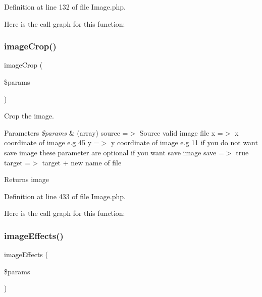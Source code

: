 Definition at line 132 of file Image.\+php.

Here is the call graph for this function\+:
\mbox{\label{class_zest_1_1_image_1_1_image_ac5079c30e25e4793c492478b097212fb}} 
\subsubsection{\texorpdfstring{image\+Crop()}{imageCrop()}}
{\footnotesize\ttfamily image\+Crop (\begin{DoxyParamCaption}\item[{}]{\$params }\end{DoxyParamCaption})}

Crop the image.


\begin{DoxyParams}{Parameters}
{\em \$params} & (array) \textquotesingle{}source\textquotesingle{} =$>$ Source valid image file \textquotesingle{}x\textquotesingle{} =$>$ x coordinate of image e.\+g 45 \textquotesingle{}y\textquotesingle{} =$>$ y coordinate of image e.\+g 11 if you do not want save image these parameter are optional if you want save image \textquotesingle{}save\textquotesingle{} =$>$ true \textquotesingle{}target\textquotesingle{} =$>$ target + new name of file\\
\hline
\end{DoxyParams}
\begin{DoxyReturn}{Returns}
image 
\end{DoxyReturn}


Definition at line 433 of file Image.\+php.

Here is the call graph for this function\+:
\mbox{\label{class_zest_1_1_image_1_1_image_a3069cd92bc1230a0ecd5ac0a6dd24853}} 
\subsubsection{\texorpdfstring{image\+Effects()}{imageEffects()}}
{\footnotesize\ttfamily image\+Effects (\begin{DoxyParamCaption}\item[{}]{\$params }\end{DoxyParamCaption})}

